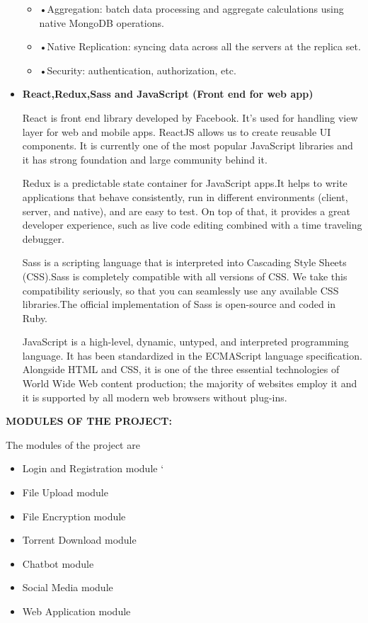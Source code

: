 \begin{itemize}
\begin{itemize}
\item •Aggregation: batch data processing and aggregate calculations using native MongoDB operations.

\item •Native Replication: syncing data across all the servers at the replica set.

\item •Security: authentication, authorization, etc.
\end{itemize}


\item	\textbf{React,Redux,Sass and JavaScript (Front end for web app) }

React is front end library developed by Facebook. It's used for handling view layer for web and mobile apps. ReactJS allows us to create reusable UI components. It is currently one of the most popular JavaScript libraries and it has strong foundation and large community behind it.

Redux is a predictable state container for JavaScript apps.It helps to write applications that behave consistently, run in different environments (client, server, and native), and are easy to test. On top of that, it provides a great developer experience, such as live code editing combined with a time traveling debugger.

Sass is a scripting language that is interpreted into Cascading Style Sheets 
  (CSS).Sass is completely compatible with all versions of CSS. We take this compatibility seriously, so that you can seamlessly use any available CSS libraries.The official implementation of Sass is open-source and coded in Ruby.

JavaScript is a high-level, dynamic, untyped, and interpreted programming language. It has been standardized in the ECMAScript language specification. Alongside HTML and CSS, it is one of the three essential technologies of World Wide Web content production; the majority of websites employ it and it is supported by all modern web browsers without plug-ins.

\end{itemize}


\newpage

\textbf{MODULES OF THE PROJECT:}

The modules of the project are
\begin{itemize}

\item	Login and Registration module
`
\item	File Upload module

\item   File Encryption module

\item   Torrent Download module

\item	Chatbot module

\item	Social Media module

\item	Web Application module

\end{itemize}



